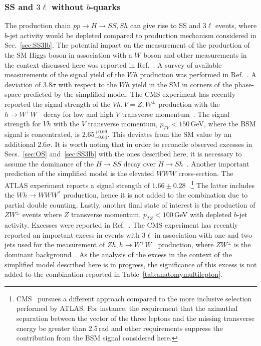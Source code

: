 \documentclass[10pt]{article}
\begin{document}
\subsubsection[SS and $3\ell$ without $b$-quarks]{\boldmath SS and $3\ell$ without $b$-quarks}
\label{sec:SS3lnob}
%
The production chain $pp\rightarrow H\rightarrow SS,Sh$ can give rise to SS and $3\ell$ events, where $b$-jet activity would be depleted compared to production mechanism considered in Sec.~\ref{sec:SS3lb}. The potential impact on the measurement of the production of the SM Higgs boson in association with a $W$ boson and other measurements in the context discussed here was reported in Ref.~\cite{Fang:2017tmh}. A survey of available measurements of the signal yield of the $Wh$ production was performed in Ref.~\cite{Hernandez:2019geu}. A deviation of 3.8$\sigma$ with respect to the $Wh$ yield in the SM in corners of the phase-space predicted by the simplified model. The CMS experiment has recently reported the signal strength of the $Vh, V=Z,W^{\pm}$ production with the $h\rightarrow W^+W^-$ decay for low and high $V$ transverse momentum~\cite{CMS:2021ixs}. The signal strength for $Vh$ with the $V$ transverse momentum, $p_{TV}<150$\,GeV, where the BSM signal is concentrated, is $2.65^{+0.69}_{-0.64}$. This deviates from the SM value by an additional 2.6$\sigma$. It is worth noting that in order to reconcile observed excesses in Secs.~\ref{sec:OS} and~\ref{sec:SS3lb} with the ones described here, it is necessary to assume the dominance of the $H\rightarrow SS$ decay over $H\rightarrow Sh$~\cite{Hernandez:2019geu}. Another important prediction of the simplified model is the elevated $WWW$ cross-section. The ATLAS experiment reports a signal strength of $1.66\pm0.28$~\cite{ATLAS-CONF-2021-039}.\footnote{CMS~\cite{CMS:2020hjs} pursues a different approach compared to the more inclusive selection performed by ATLAS. For instance, the requirement that the azimuthal separation between the vector of the three leptons and the missing transverse energy be greater than 2.5\,rad and other requirements suppress the contribution from the BSM signal considered here.} The latter includes the $Wh\rightarrow WWW^*$ production, hence it is not added to the combination due to partial double counting. Lastly, another final state of interest is the production of $ZW^{\pm}$ events where $Z$ transverse momentum, $p_{TZ}<100$\,GeV with depleted $b$-jet activity. Excesses were reported in Ref.~\cite{vonBuddenbrock:2019ajh}. The CMS experiment has recently reported an important excess in events with $3\ell$ in association with one and two jets used for the measurement of $Zh, h\rightarrow W^+W^-$ production, where $ZW^{\pm}$ is the dominant background~\cite{CMS:2021ixs}. As the analysis of the excess in the context of the simplified model described here is in progress, the significance of this excess is not added to the combination reported in Table~\ref{tab:anatomymultilepton}. 
\end{document}
